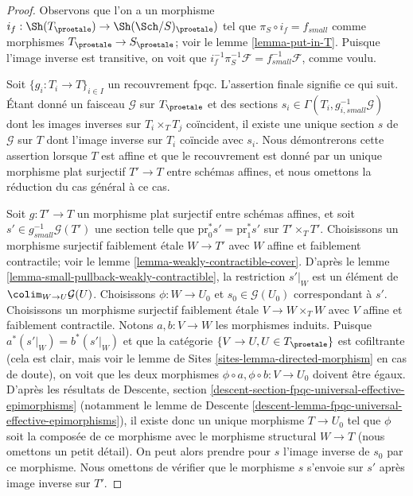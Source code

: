 \begin{proof}
Observons que l'on a un morphisme
$i_f : \Sh(T_\proetale) \to \Sh(\Sch/S)_\proetale)$
tel que $\pi_S \circ i_f = f_{small}$ comme morphismes
$T_\proetale \to S_\proetale$; voir le lemme \ref{lemma-put-in-T}.
Puisque l'image inverse est transitive, on voit que
$i_f^{-1} \pi_S^{-1}\mathcal{F} = f_{small}^{-1}\mathcal{F}$, comme voulu.

\medskip\noindent
Soit $\{g_i : T_i \to T\}_{i \in I}$ un recouvrement fpqc. L'assertion finale
signifie ce qui suit. Étant donné un faisceau $\mathcal{G}$ sur $T_\proetale$ et des
sections $s_i \in \Gamma(T_i, g_{i, small}^{-1}\mathcal{G})$ dont les images inverses
sur $T_i \times_T T_j$ coïncident, il existe une unique section $s$ de $\mathcal{G}$
sur $T$ dont l'image inverse sur $T_i$ coïncide avec $s_i$. Nous démontrerons cette
assertion lorsque $T$ est affine et que le recouvrement est donné par un unique
morphisme plat surjectif $T' \to T$ entre schémas affines, et nous omettons la réduction
du cas général à ce cas.

\medskip\noindent
Soit $g : T' \to T$ un morphisme plat surjectif entre schémas affines, et soit
$s' \in g_{small}^{-1}\mathcal{G}(T')$ une section telle que
$\text{pr}_0^*s' = \text{pr}_1^*s'$ sur $T' \times_T T'$.
Choisissons un morphisme surjectif faiblement \'etale $W \to T'$ avec
$W$ affine et faiblement contractile; voir le
lemme \ref{lemma-weakly-contractible-cover}. D'après le
lemme \ref{lemma-small-pullback-weakly-contractible},
la restriction $s'|_W$ est un élément de $\colim_{W \to U} \mathcal{G}(U)$.
Choisissons $\phi : W \to U_0$ et $s_0 \in \mathcal{G}(U_0)$ correspondant à $s'$.
Choisissons un morphisme surjectif faiblement \'etale $V \to W \times_T W$
avec $V$ affine et faiblement contractile.
Notons $a, b : V \to W$ les morphismes induits.
Puisque $a^*(s'|_W) = b^*(s'|_W)$ et que la catégorie
$\{V \to U, U \in T_\proetale\}$ est cofiltrante
(cela est clair, mais voir le
lemme de Sites \ref{sites-lemma-directed-morphism} en cas de doute),
on voit que les deux morphismes $\phi \circ a , \phi \circ b : V \to U_0$
doivent être égaux. D'après les résultats de
Descente, section \ref{descent-section-fpqc-universal-effective-epimorphisms}
(notamment le
lemme de Descente \ref{descent-lemma-fpqc-universal-effective-epimorphisms}),
il existe donc un unique morphisme $T \to U_0$ tel que $\phi$
soit la composée de ce morphisme avec le morphisme structural $W \to T$
(nous omettons un petit détail). On peut alors prendre pour $s$ l'image inverse
de $s_0$ par ce morphisme. Nous omettons de vérifier que
le morphisme $s$ s'envoie sur $s'$ après image inverse sur $T'$.
\end{proof}









